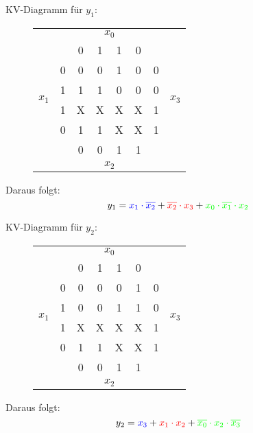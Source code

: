 \documentclass[DIN, pagenumber=false, fontsize=11pt, parskip=half]{scrartcl}
\begin{document}
\begin{enumerate}[label=(\alph*)]
			KV-Diagramm für $y_1$:
			\begin{figure}[H]
                \centering
                \begin{tabular}{cc|cccc|cc}
                    & &  & \multicolumn{2}{c}{$x_0$} & & \\
                    & & 0 & 1 & 1 & 0\\
                    \midrule
                    \multirow{4}{*}{$x_1$} & 0 & 0 & 0 & \cellcolor{green!50}1 & 0 & 0 &\multirow{4}{*}{$x_3$}\\
                     & 1 & \cellcolor{blue!50}1 & \cellcolor{blue!50}1 & 0 & 0 & 0\\
                     & 1 & \cellcolor{purple!50}X & \cellcolor{purple!50}X & X & X & 1\\
                     & 0 & \cellcolor{red!50}1 & \cellcolor{red!50}1 & \cellcolor{green!50}X & X & 1\\
                    \midrule
                    & & 0 & 0 & 1 & 1\\
                    & &  & \multicolumn{2}{c}{$x_2$} & & \\
                \end{tabular}
            \end{figure}
			Daraus folgt:
			\begin{equation*}
				y_1 = \textcolor{blue}{x_1 \cdot \overline{x_2}} + \textcolor{red}{\overline{x_2} \cdot x_3} + \textcolor{green}{x_0 \cdot \overline{x_1} \cdot x_2}
			\end{equation*}

			KV-Diagramm für $y_2$:
			\begin{figure}[H]
                \centering
                \begin{tabular}{cc|cccc|cc}
                    & &  & \multicolumn{2}{c}{$x_0$} & & \\
                    & & 0 & 1 & 1 & 0\\
                    \midrule
                    \multirow{4}{*}{$x_1$} & 0 & 0 & 0 & 0 & \cellcolor{green!50}1 & 0 &\multirow{4}{*}{$x_3$}\\
                     & 1 & 0 & 0 & \cellcolor{red!50}1 & \cellcolor{yellow!50}1 & 0\\
                     & 1 & \cellcolor{blue!50}X & \cellcolor{blue!50}X & \cellcolor{purple!50}X & \cellcolor{purple!50}X & 1\\
                     & 0 & \cellcolor{blue!50}1 & \cellcolor{blue!50}1 & \cellcolor{blue!50}X & \cellcolor{blue!50}X & 1\\
                    \midrule
                    & & 0 & 0 & 1 & 1\\
                    & &  & \multicolumn{2}{c}{$x_2$} & & \\
                \end{tabular}
            \end{figure}
			Daraus folgt:
			\begin{equation*}
				y_2 = \textcolor{blue}{x_3} + \textcolor{red}{x_1 \cdot x_2} + \textcolor{green}{\overline{x_0} \cdot x_2 \cdot \overline{x_3}}
			\end{equation*}


\end{enumerate}
\end{document}
